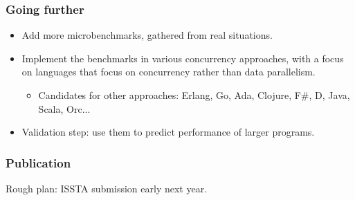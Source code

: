 \documentclass{beamer}
\begin{document}
\begin{frame}
  \frametitle{Going further}
  \begin{itemize}
  \item Add more microbenchmarks, gathered from real situations.
  \item Implement the benchmarks in various concurrency approaches,
    with a focus on languages that focus on concurrency rather than
    data parallelism.
    \begin{itemize}
      \item Candidates for other approaches: Erlang, Go, Ada, Clojure, F\#, D, Java, Scala, Orc...
    \end{itemize}
  \item Validation step: use them to predict performance of larger programs.
  \end{itemize}
\end{frame}

\begin{frame}
  \frametitle{Publication}
  Rough plan: ISSTA submission early next year.
\end{frame}
\end{document}
